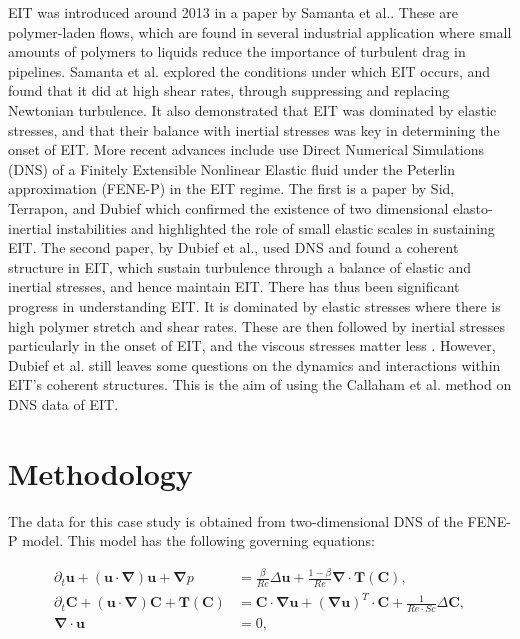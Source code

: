 \documentclass[12pt]{report} %
\begin{document}
EIT was introduced around 2013 in a paper by Samanta et al.\cite{Samanta2012eit}. These are polymer-laden flows, which are found in several industrial application where small amounts of polymers to liquids reduce the importance of turbulent drag in pipelines. Samanta et al.\cite{Samanta2012eit} explored the conditions under which EIT occurs, and found that it did at high shear rates, through suppressing and replacing Newtonian turbulence. It also demonstrated that EIT was dominated by elastic stresses, and that their balance with inertial stresses was key in determining the onset of EIT. More recent advances include use Direct Numerical Simulations (DNS) of a Finitely Extensible Nonlinear Elastic fluid under the Peterlin approximation (FENE-P) in the EIT regime\cite{beneitez2024multistability}. The first is a paper by Sid, Terrapon, and Dubief \cite{sid2018two} which confirmed the existence of two dimensional elasto-inertial instabilities and highlighted the role of small elastic scales in sustaining EIT. The second paper, by Dubief et al.\cite{dubief2022first}, used DNS and found a coherent structure in EIT, which sustain turbulence through a balance of elastic and inertial stresses, and hence maintain EIT. There has thus been significant progress in understanding EIT. It is dominated by elastic stresses where there is high polymer stretch and shear rates. These are then followed by inertial stresses particularly in the onset of EIT, and the viscous stresses matter less \cite{Samanta2012eit, sid2018two, dubief2022first}. However, Dubief et al.\cite{dubief2022first} still leaves some questions on the dynamics and interactions within EIT's coherent structures. This is the aim of using the Callaham et al. method on DNS data of EIT\cite{beneitez2024multistability}.

\section{Methodology}

The data for this case study is obtained from two-dimensional DNS of the FENE-P model. This model has the following governing equations:

\begin{equation}
  \begin{aligned}
    \partial_t \mathbf{u} + (\mathbf{u} \cdot \mathbf{\nabla}) \mathbf{u} + \mathbf{\nabla} p &= \frac{\beta}{Re} \Delta \mathbf{u} + \frac{1 - \beta}{Re} \mathbf{\nabla} \cdot \mathbf{T}(\mathbf{C}), \\
    \partial_t \mathbf{C} + (\mathbf{u} \cdot \mathbf{\nabla}) \mathbf{C} + \mathbf{T}(\mathbf{C}) &= \mathbf{C} \cdot \mathbf{\nabla} \mathbf{u} + (\mathbf{\nabla} \mathbf{u})^T \cdot \mathbf{C} + \frac{1}{Re \cdot Sc} \Delta \mathbf{C}, \\
    \mathbf{\nabla} \cdot \mathbf{u} &= 0,
  \end{aligned}
\end{equation}
\end{document}
